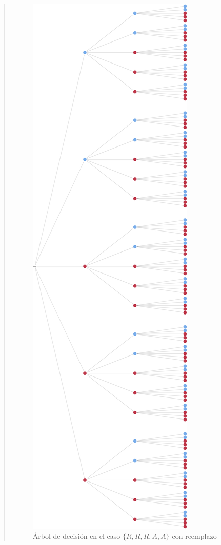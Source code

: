 \documentclass[
]{book}
\begin{document}
\begin{quote}
\begin{figure}
\centering
\includegraphics{./images/arbol_decision_2.jpeg}
\caption{Árbol de decisión en el caso \(\{ R, R, R, A, A\}\) con reemplazo}
\end{figure}


\end{quote}
\end{document}
